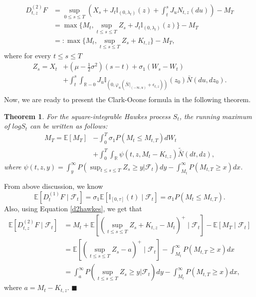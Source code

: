 \documentclass[11pt]{article}
\numberwithin{equation}{section}
\newtheorem{Theorem}{Theorem}[section]
\newenvironment{Proof}{\noindent{\bf Proof.}}{\hfill{$\blacksquare$}}
\begin{document}
\begin{align}
D_{t, z}^{(2)} F& =\sup _{0 \leq s \leq T}\left(X_{s}+J_{t}\mathbb{I}_{(0,\lambda_t)}(z)+\int_t^{s}J_{u}N_{t,z}(du)\right)-M_{T}\nonumber\\
&= \max \big\{M_t , \sup_{t \leq s \leq T}Z_s +J_t \mathbb{I}_{(0,\lambda_t)}(z)\big\}-M_{T}\nonumber\\
&=: \max \big\{M_t , \sup_{t \leq s \leq T}Z_s+ K_{t,z}\big\}-M_{T}, \label{d2hawkes}
\end{align}
where for every $t \leq s \leq T$
\begin{align*}
Z_s= X_t &+  (\mu - \frac12 \sigma^2) (s-t) +\sigma_1 (W_{s}-W_t) \\
&+\int_t^s \int_{\mathbb{R}-0} J_u \mathbb{I}_{(0, \varphi_u (\bar{N}|_{(-\infty, u)}+\epsilon_{t,z}))}(z_0)\bar{N}(du, dz_0).\\
\end{align*} 
Now, we are ready to present the Clark-Ocone formula in the following theorem.
\begin{Theorem}
For the square-integrable Hawkes process $S_t$, the running maximum of $log S_t$ can be written as follows:
\begin{align*}
M_{T}=\mathbb{E}\left[M_{T}\right] &-\int_{0}^{T} \sigma_1  P(M_t \leq M{_{t,T}}) dW_t \\
& +\int_{0}^{T} \int_{\mathbb{R}} \psi\left(t, z, M_{t}-K_{t, z}\right) \tilde{\bar{N}}(d t, d z),
\end{align*}
where $\psi(t, z, y)=\int_y^\infty P(\sup_{t \leq s \leq T}Z_s \geq y \vert \mathcal{F}_t) dy-\int_{M_t}^{\infty} P(M_{t,T} \geq x) d x$.
\end{Theorem}
\begin{Proof}
From above discussion, we know 
$$
\mathbb{E}\left[D_{t}^{(1)} F \mid \mathcal{F}_{t}\right]=\sigma_1 \mathbb{E}\left[\mathbb{I}_{[0, \tau]}(t)\mid \mathcal{F}_{t}\right]=\sigma_1  P(M_t \leq M{_{t,T}}).
$$
Also, using Equation \eqref{d2hawkes}, we get that
\begin{align}
\mathbb{E}\left[D_{t, z}^{(2)} F \mid \mathcal{F}_{t}\right] 
& =M_{t}+\mathbb{E}\left[\left(\sup_{t \leq s \leq T}Z_s+K_{t,z}-M_{t}\right)^{+} \mid \mathcal{F}_{t}\right]-\mathbb{E}\left[M_{T} \mid \mathcal{F}_{t}\right] \nonumber\\
& =\mathbb{E}\left[\left(\sup_{t \leq s \leq T}Z_s-a \right)^{+} \mid \mathcal{F}_{t}\right]-\int_{M_t}^{\infty} P(M_{t,T} \geq x) d x \nonumber\\
& =\int_a^\infty P(\sup_{t \leq s \leq T}Z_s \geq y \vert \mathcal{F}_t) dy-\int_{M_t}^{\infty} P(M_{t,T} \geq x) d x,  \label{distribute}
\end{align}
where $a=M_t - K_{t,z}$. 
\end{Proof}\\
\end{document}
